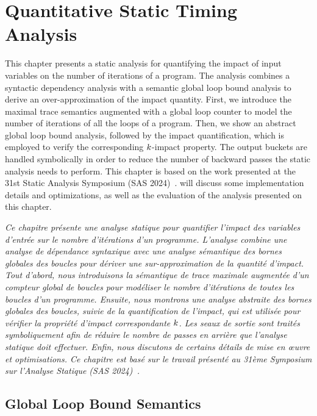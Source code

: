 \chapter{Quantitative Static Timing Analysis}

This chapter presents a static analysis for quantifying the impact of input variables on the number of iterations of a program.
The analysis combines a syntactic dependency analysis with a semantic global loop bound analysis to derive an over-approximation of the impact quantity.
First, we introduce the maximal trace semantics augmented with a global loop counter to model the number of iterations of all the loops of a program.
Then, we show an abstract global loop bound analysis, followed by the impact quantification, which is employed to verify the corresponding $k$-impact property.
The output buckets are handled symbolically in order to reduce the number of backward passes the static analysis needs to perform.
This chapter is based on the work presented at the 31st Static Analysis Symposium (SAS 2024)~\cite{Mazzucato2024c}.
 will discuss some implementation details and optimizations, as well as the evaluation of the analysis presented on this chapter.

\emph{Ce chapitre présente une analyse statique pour quantifier l'impact des variables d'entrée sur le nombre d'itérations d'un programme. L'analyse combine une analyse de dépendance syntaxique avec une analyse sémantique des bornes globales des boucles pour dériver une sur-approximation de la quantité d'impact. Tout d'abord, nous introduisons la sémantique de trace maximale augmentée d'un compteur global de boucles pour modéliser le nombre d'itérations de toutes les boucles d'un programme. Ensuite, nous montrons une analyse abstraite des bornes globales des boucles, suivie de la quantification de l'impact, qui est utilisée pour vérifier la propriété d'impact correspondante $k$. Les seaux de sortie sont traités symboliquement afin de réduire le nombre de passes en arrière que l'analyse statique doit effectuer. Enfin, nous discutons de certains détails de mise en œuvre et optimisations. Ce chapitre est basé sur le travail présenté au 31ème Symposium sur l'Analyse Statique (SAS 2024)~.}



\section{Global Loop Bound Semantics}



